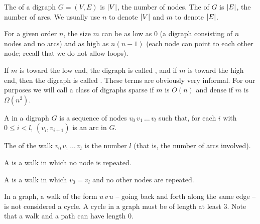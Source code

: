 \begin{Definition} 
The  of a digraph $G = (V, E)$ is $\lvert V\rvert$, the number of nodes. 
The  of $G$ is $\lvert E\rvert$, the number of arcs. 
We usually use $n$ to denote $\lvert V\rvert$ and $m$ to denote $\lvert E\rvert$.
\end{Definition}
 
For a given order $n$, the size $m$ can be as low as $0$ (a digraph consisting of $n$ nodes and no arcs)  
and as high as $n(n-1)$ (each node can point to each other node; recall that we do not allow loops).

\begin{Definition}  
If $m$ is toward the low end, the digraph is called , 
and if $m$ is toward the high end, then the digraph is called . 
These terms are obviously very informal. 
For our purposes we will call a class of digraphs sparse if $m$ is $O(n)$ and dense if $m$ is $\Omega(n^2)$.
\end{Definition}

\begin{Definition} 
A  in a digraph $G$ is a sequence of nodes $v_0\, v_1\, \ldots\, v_l$ 
such that, for each $i$ with $0 \leq i < l$, $(v_i, v_{i+1})$ is an arc in $G$. 

The  of the walk $v_0\, v_1\, \ldots \,v_l$ is the number $l$ (that is, the number of arcs involved).

A  is a walk in which no node is repeated. 

A  is a walk in which $v_0 = v_l$ and no other nodes
are repeated.
\end{Definition}

In a graph, a walk of the form $u\, v\, u$ -- going back and forth along the same edge -- is not considered a cycle. 
A cycle in a graph must be of length at least $3$.
Note that a walk and a path can have length 0.



